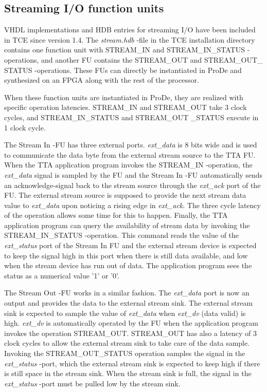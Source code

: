 \documentclass[twoside]{tceusermanual}
\begin{document}
\subsection{Streaming I/O function units}
VHDL implementations and HDB entries for streaming I/O have been included 
in TCE since version 1.4. The \textit{stream.hdb} -file in the TCE installation
directory contains one function unit with STREAM\_IN and
STREAM\_IN\_STATUS -operations, and another FU contains the STREAM\_OUT and STREAM\_OUT\_
STATUS
-operations. These FUs can directly be instantiated in ProDe and synthesized
on an FPGA along with the rest of the processor.

When these function units are instantiated in ProDe, they are realized with
specific operation latencies. STREAM\_IN and STREAM\_OUT
take 3 clock cycles, and STREAM\_IN\_STATUS and STREAM\_OUT
\_STATUS execute in 1 clock cycle.

The Stream In -FU has three external ports. \textit{ext\_data} is 8 bits wide
and is used to communicate the data byte from the external stream source to the 
TTA FU. When the TTA application program invokes the STREAM\_IN -operation, the
\textit{ext\_data} signal is sampled by the FU and the Stream In -FU automatically sends
an acknowledge-signal back to the stream source through the \textit{ext\_ack}
port of the FU. The external stream source is supposed to provide the next stream
data value to \textit{ext\_data} upon noticing a rising edge in \textit{ext\_ack}.
The three cycle latency of the operation allows some time for this to happen. Finally,
the TTA application program can query the availability of stream data by invoking
the STREAM\_IN\_STATUS -operation. This command reads the value of the \textit{ext\_status}
port of the Stream In FU and the external stream device is expected to keep the signal
high in this port when there is still data available, and low when the stream 
device has run out of data. The application program sees the status as a numerical 
value '1' or '0'.

The Stream Out -FU works in a similar fashion. The \textit{ext\_data} port is now 
an output and provides the data to the external stream sink. The external stream
sink is expected to sample the value of \textit{ext\_data} when \textit{ext\_dv}
(data valid) is high. \textit{ext\_dv} is automatically operated by the FU when
the application program invokes the operation STREAM\_OUT. STREAM\_OUT has also
a latency of 3 clock cycles to allow the external stream sink to take care of the
data sample. Invoking the STREAM\_OUT\_STATUS operation samples the signal in
the \textit{ext\_status} -port, which the external stream sink is expected to keep
high if there is still space in the stream sink. When the stream sink is full, the
signal in the \textit{ext\_status} -port must be pulled low by the stream sink.
\end{document}
